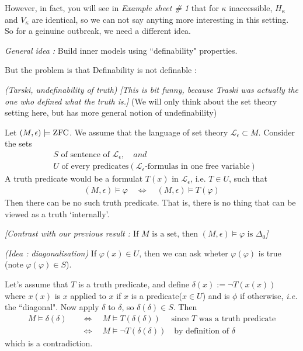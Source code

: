 \documentclass[12pt,a4paper]{article}
\newenvironment{proof}
{\begin{changemargin}{0.5cm}{0.5cm} 
	}%
	{\end{changemargin}
}
\newenvironment{p}
{\begin{proof} 
	}%
	{\end{proof}
}
\begin{document}
However, in fact, you will see in \emph{Example sheet \# 1} that for $\kappa$ inaccessible, $H_{\kappa}$ and $V_{\kappa}$ are identical, so we can not say anyting more interesting in this setting. So for a geinuine outbreak, we need a different idea.
\s

\emph{General idea :} Build inner models using ``definability" properties.
\s

But the problem is that Definability is not definable :
\s

\thm \emph{(Tarski, undefinability of truth)} \emph{[This is bit funny, because Traski was actually the one who defined what the truth is.]} (We will only think about the set theory setting here, but has more general notion of undefinability)

\quad Let $(M, \epsilon) \models \text{ZFC}$. We assume that the language of set theory $\mathscr{L}_{\epsilon} \subset M$. Consider the sets
\begin{align*}
&S \text{ of sentence of } \mathscr{L}_{\epsilon}, \quad \textit{and} \\
&U \text{ of every predicates} (\mathscr{L}_{\epsilon} \text{-formulas in one free variable})
\end{align*}
A truth predicate would be a formulat $T(x)$ in $\mathscr{L}_{\epsilon}$, i.e. $T\in U$, such that
\begin{align*}
(M, \epsilon) \models \varphi \quad \Leftrightarrow \quad (M, \epsilon) \models T(\varphi)
\end{align*}
Then there can be no such truth predicate. That is, there is no thing that can be viewed as a truth `internally'.

\quad \emph{[Contrast with our previous result : $\text{If } M \text{ is a set, then } (M, \epsilon) \models \varphi \text{ is } \Delta_0$]}
\begin{p}
\pf \emph{(Idea : diagonalisation)} If $\varphi(x) \in U$, then we can ask wheter $\varphi(\varphi)$ is true (note $\varphi(\varphi) \in S$).

\quad Let's assume that $T$ is a truth predicate, and define $\delta(x) := \neg T(x(x))$ where $x(x)$ is $x$ applied to $x$ if $x$ is a predicate($x\in U$) and is $\phi$ if otherwise, \textit{i.e.} the ``diagonal". Now apply $\delta$ to $\delta$, so $\delta(\delta) \in S$. Then
\begin{align*}
M \models \delta(\delta) \quad &\Leftrightarrow \quad M \models T(\delta(\delta)) \quad \text{ since } T \text{ was a truth predicate} \\
&\Leftrightarrow \quad  M \models \neg T(\delta(\delta)) \quad \text{by definition of } \delta
\end{align*}
which is a contradiction.

\eop
\end{p}
\s
\end{document}
